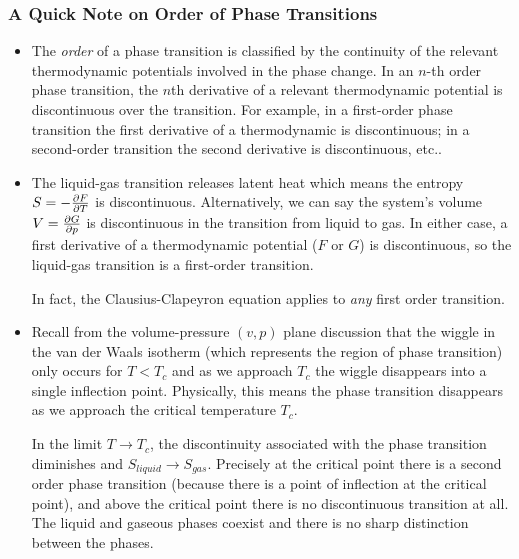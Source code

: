 \documentclass[11pt, a4paper]{article}
\begin{document}
\subsubsection{A Quick Note on Order of Phase Transitions}
\begin{itemize}
	\item The \textit{order} of a phase transition is classified by the continuity of the relevant thermodynamic potentials involved in the phase change. In an $ n $-th order phase transition, the $ n $th derivative of a relevant thermodynamic potential is discontinuous over the transition. For example, in a first-order phase transition the first derivative of a thermodynamic is discontinuous; in a second-order transition the second derivative is discontinuous, etc..
	
	\item The liquid-gas transition releases latent heat which means the entropy $ S = -\pdv{F}{T} $ is discontinuous. Alternatively, we can say the system's volume $ V = \pdv{G}{p} $ is discontinuous in the transition from liquid to gas. In either case, a first derivative of a thermodynamic potential ($ F $ or $ G $) is discontinuous, so the liquid-gas transition is a first-order transition. 
	
	In fact, the Clausius-Clapeyron equation applies to \textit{any} first order transition.
	
	\item Recall from the volume-pressure $ (v, p) $ plane discussion that the wiggle in the van der Waals isotherm (which represents the region of phase transition) only occurs for $ T < T_{c} $ and as we approach $ T_{c} $ the wiggle disappears into a single inflection point. Physically, this means the phase transition disappears as we approach the critical temperature $ T_{c} $. 
	
	In the limit $ T \to T_{c} $, the discontinuity associated with the phase transition diminishes and $ S_{liquid} \to S_{gas} $. Precisely at the critical point there is a second order phase transition (because there is a point of inflection at the critical point), and above the critical point there is no discontinuous transition at all. The liquid and gaseous phases coexist and there is no sharp distinction between the phases.
	
\end{itemize}
\end{document}
